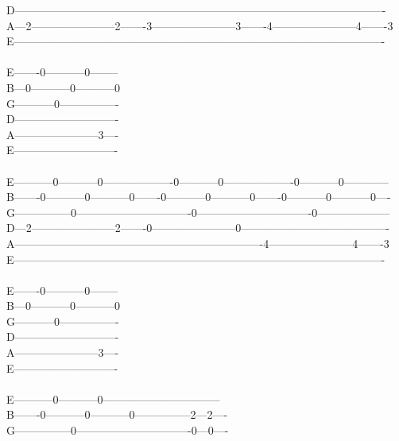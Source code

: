 {D----------------------------------------------------------------------------------------------------\\
A---2-----------------------2-------3-----------------------3-------4-----------------------4-------3\\
E----------------------------------------------------------------------------------------------------\\
\ \ \ \ \ \ \ \ \ \ \ \ \ \ \ \ \ \ \ \ \ \ \ \ \ \ \\
E-------0-----------0--------\\
B---0-----------0-----------0\\
G-----------0----------------\\
D----------------------------\\
A-----------------------3----\\
E----------------------------\\
\\
E-----------0-----------0-------------------0-----------0-------------------0-----------0------------\\
B-------0-----------0-----------0-------0-----------0-----------0-------0-----------0-----------0----\\
G---------------0-------------------------------0-------------------------------0--------------------\\
D---2-----------------------2-------0-----------------------0----------------------------------------\\
A-------------------------------------------------------------------4-----------------------4-------3\\
E----------------------------------------------------------------------------------------------------\\
\\
E-------0-----------0--------\\
B---0-----------0-----------0\\
G-----------0----------------\\
D----------------------------\\
A-----------------------3----\\
E----------------------------\\
\\
E-----------0-----------0--------------------------------\\
B-------0-----------0-----------0---------------2---2----\\
G---------------0-------------------------------0---0----\\
}
